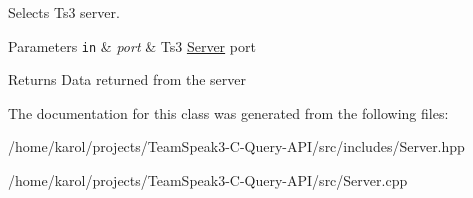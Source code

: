 Selects Ts3 server. 


\begin{DoxyParams}[1]{Parameters}
\mbox{\tt in}  & {\em port} & Ts3 \hyperlink{class_ts3_api_1_1_server}{Server} port\\
\hline
\end{DoxyParams}
\begin{DoxyReturn}{Returns}
Data returned from the server 
\end{DoxyReturn}


The documentation for this class was generated from the following files\+:\begin{DoxyCompactItemize}
\item 
/home/karol/projects/\+Team\+Speak3-\/\+C-\/\+Query-\/\+A\+P\+I/src/includes/Server.\+hpp\item 
/home/karol/projects/\+Team\+Speak3-\/\+C-\/\+Query-\/\+A\+P\+I/src/Server.\+cpp\end{DoxyCompactItemize}
